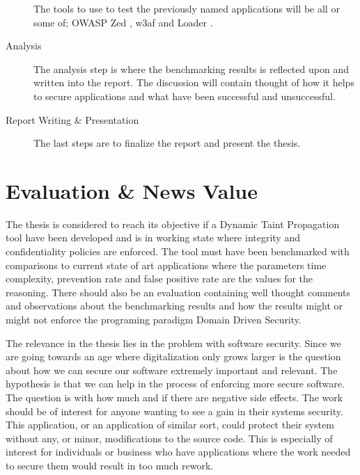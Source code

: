 \documentclass{../kththesis}
\begin{document}
\begin{description}
		The tools to use to test the previously named applications will be all or some of; OWASP Zed \parencite{zed}, w3af \parencite{w3af} and Loader \parencite{loader}.
	
		\item [Analysis]
		The analysis step is where the benchmarking results is reflected upon and written into the report. The discussion will contain thought of how it helps to secure applications and what have been successful and unsuccessful.
	
		\item [Report Writing \& Presentation]
		The last steps are to finalize the report and present the thesis.
	\end{description}
	
	
	
	\chapter{Evaluation \& News Value}
	The thesis is considered to reach its objective if a Dynamic Taint Propagation tool have been developed and is in working state where integrity and confidentiality policies are enforced. The tool must have been benchmarked with comparisons to current state of art applications where the parameters time complexity, prevention rate and false positive rate are the values for the reasoning. There should also be an evaluation containing well thought comments and observations about the benchmarking results and how the results might or might not enforce the programing paradigm Domain Driven Security.
	
	The relevance in the thesis lies in the problem with software security. Since we are going towards an age where digitalization only grows larger is the question about how we can secure our software extremely important and relevant. The hypothesis is that we can help in the process of enforcing more secure software. The question is with how much and if there are negative side effects. The work should be of interest for anyone wanting to see a gain in their systems security. This application, or an application of similar sort, could protect their system without any, or minor, modifications to the source code. This is especially of interest for individuals or business who have applications where the work needed to secure them would result in too much rework.
	
\end{document}
